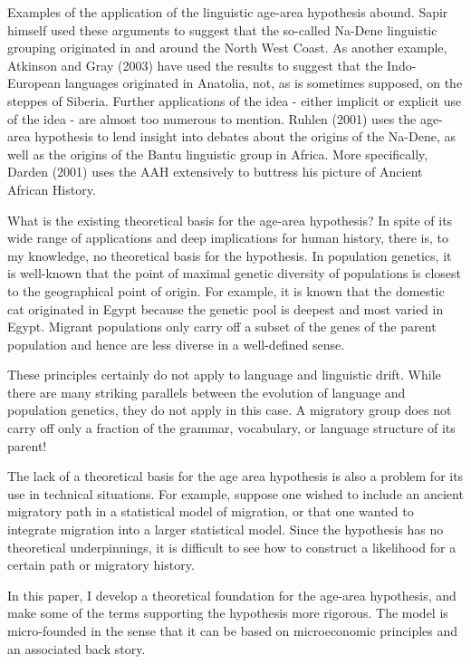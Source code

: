 \documentclass[11pt]{article}
\begin{document}
Examples of the application of the linguistic age-area hypothesis  abound. Sapir himself used these arguments to suggest that the so-called Na-Dene linguistic grouping originated in and around the North West Coast. As another example, Atkinson and Gray (2003) have used the results to suggest that the Indo-European languages originated in Anatolia, not, as is sometimes supposed, on the steppes of Siberia. Further applications of the idea - either implicit or explicit use of the idea - are almost too numerous to mention. Ruhlen (2001) uses the age-area hypothesis to lend insight into debates about the origins of the Na-Dene, as well as the origins of the Bantu linguistic group in Africa.
More specifically, Darden (2001) uses the AAH extensively to buttress his picture of Ancient African History. 

What is the existing theoretical basis for the age-area hypothesis? In spite of its wide range of applications and deep implications for human history, there is, to my knowledge, no theoretical basis for the hypothesis. In population genetics, it is well-known that
the point of maximal genetic diversity of populations is closest to the geographical point of origin. For example, it is known that the domestic cat originated in Egypt because the genetic pool is deepest and most varied in Egypt. Migrant populations only carry off a subset of the genes of the parent population and hence are less diverse in a well-defined sense. 

These principles certainly do not apply to language and linguistic drift. While there are many striking parallels between the evolution of language and population genetics, they do not apply in this case. A migratory group does not carry off only a fraction of the grammar, vocabulary, or language structure of its parent! 

The lack of a theoretical basis for the  age area hypothesis is also a problem for its use in technical situations. For example, suppose one wished to include an ancient migratory path in a statistical model of migration, or that one wanted to integrate migration into a larger statistical model. Since the hypothesis has no theoretical underpinnings, it is difficult to see how to construct a likelihood for a certain path or migratory history.

In this paper, I develop a theoretical foundation for the age-area hypothesis, and make some of the terms supporting the hypothesis more rigorous. The model is micro-founded in the sense that it can be based on microeconomic principles and an associated back story. 
\end{document}
